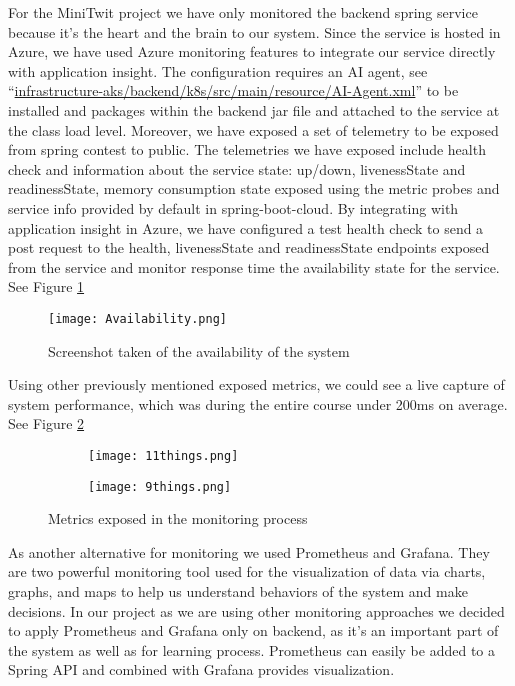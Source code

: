 For the MiniTwit project we have only monitored the backend spring service because it's the heart and the brain to our system. Since the service is hosted in Azure, we have used Azure monitoring features to integrate our service directly with application insight. The configuration requires an AI agent, see “\url{infrastructure-aks/backend/k8s/src/main/resource/AI-Agent.xml}” to be installed and packages within the backend jar file and attached to the service at the class load level. Moreover, we have exposed a set of telemetry to be exposed from spring contest to public. The telemetries we have exposed include health check and information about the service state: up/down, livenessState and readinessState, memory consumption state exposed using the metric probes and service info provided by default in spring-boot-cloud.
\newpage
By integrating with application insight in Azure, we have configured a test health check to send a post request to the health, livenessState and readinessState endpoints exposed from the service and monitor response time the availability state for the service. See Figure \ref{fig:availability} 
\begin{figure}[h]
    \centering
    \texttt{[image: Availability.png]}
    \caption{Screenshot taken of the availability of the system}
    \label{fig:availability}
\end{figure}

Using other previously mentioned exposed metrics, we could see a live capture of system performance, which was during the entire course under 200ms on average. See Figure \ref{fig:metrics} 
\begin{figure}[h]
    \centering
    \begin{subfigure}[b]{0.49\textwidth}
        \texttt{[image: 11things.png]}
    \end{subfigure}
    \hfill
        \begin{subfigure}[b]{0.49\textwidth}
        \texttt{[image: 9things.png]}
    \end{subfigure}
    \caption{Metrics exposed in the monitoring process}
    \label{fig:metrics}
\end{figure}

As another alternative for monitoring we used Prometheus and Grafana. They are two powerful monitoring tool used for the visualization of data via charts, graphs, and maps to help us understand behaviors of the system and make decisions. 
 In our project as we are using other monitoring approaches we decided to apply Prometheus and Grafana only on backend, as it's an important part of the system as well as for learning process.
Prometheus can easily be added to a Spring API and combined with Grafana provides visualization.

